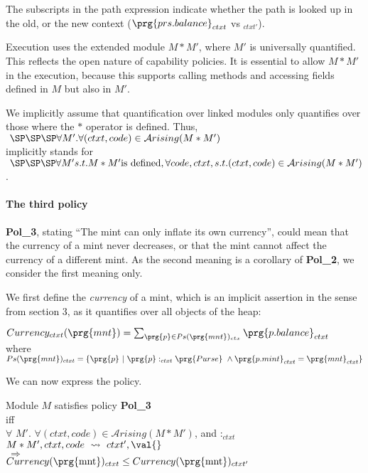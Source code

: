 The subscripts in the path expression   indicate whether the path is looked up in the old, or the new context ($\prg{prs.balance}_{ctxt}$ vs $_{ctxt'}$).

Execution uses the extended module $M*M'$, where $M'$ is universally quantified. This reflects the open nature of capability policies. It is essential to allow   $M*M'$ in the execution, because this supports  calling methods and accessing fields defined in $M$ but also in $M'$.
 
We implicitly assume that quantification over linked modules only quantifies over those where
the $*$ operator is defined. Thus, 
\\ $~ \SP \SP \SP \forall M'. \forall (ctxt,code)\in {\mathcal A}rising(M*M')$ 
\\ implicitly stands for \\
$~ \SP \SP \SP \forall M' s.t. M*M' \mbox{is defined},  \forall code, ctxt, s.t. (ctxt,code)\in {\mathcal A}rising(M*M')$. 

\paragraph{The third policy} {\bf Pol\_3}, stating  ``The mint can only inflate its own currency'',
  could  mean  that the currency of a mint never decreases, or
  that the mint cannot affect the currency of a different mint. 
  As the second meaning is a corollary of {\bf Pol\_2}, we consider the first meaning only.

We first  define the {\em currency} of a mint, which is an implicit assertion in the sense from section 3, as it  quantifies over all objects of the heap:
\begin{center}
$
Currency_{ctxt}(\prg{mnt})=\sum_{\prg{p}\in Ps(\prg{mnt})_{ctx}}\prg{p.balance}_{ctxt}$
\\
where $Ps(\prg{mnt})_{ctxt} = \{ \prg{p} \ | \ \prg{p}:_{ctxt} \prg{Purse } \ \wedge
\prg{p.mint}_{ctxt}=\prg{mnt}_{ctxt} \} $
\end{center}

We can now express the policy.


\begin{shaded}
\begin{center}
Module $M$ satisfies policy {\bf Pol\_3} \\
iff \\
$ \forall$ $M'$.  %
 $\forall (ctxt, code)\in{\mathcal A}rising(M*M')$,  and  $:_{ctxt}$ \\
$ M*M', ctxt, code \ \leadsto \ ctxt', \val{} $ \\
$ \ \Rightarrow\ $
\\
 $ Currency(\mbox{\prg{mnt}})_{ctxt}\leq  Currency(\mbox{\prg{mnt}})_{ctxt'} $
 \end{center}
\end{shaded}

